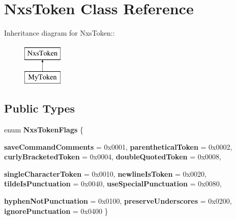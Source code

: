 \hypertarget{classNxsToken}{
\section{NxsToken Class Reference}
\label{classNxsToken}
}
Inheritance diagram for NxsToken::\begin{figure}[H]
\begin{center}
\leavevmode
\includegraphics[height=2cm]{classNxsToken}
\end{center}
\end{figure}
\subsection*{Public Types}
\begin{DoxyCompactItemize}
\item 
enum {\bfseries NxsTokenFlags} \{ \par
{\bfseries saveCommandComments} =  0x0001, 
{\bfseries parentheticalToken} =  0x0002, 
{\bfseries curlyBracketedToken} =  0x0004, 
{\bfseries doubleQuotedToken} =  0x0008, 
\par
{\bfseries singleCharacterToken} =  0x0010, 
{\bfseries newlineIsToken} =  0x0020, 
{\bfseries tildeIsPunctuation} =  0x0040, 
{\bfseries useSpecialPunctuation} =  0x0080, 
\par
{\bfseries hyphenNotPunctuation} =  0x0100, 
{\bfseries preserveUnderscores} =  0x0200, 
{\bfseries ignorePunctuation} =  0x0400
 \}
\end{DoxyCompactItemize}
